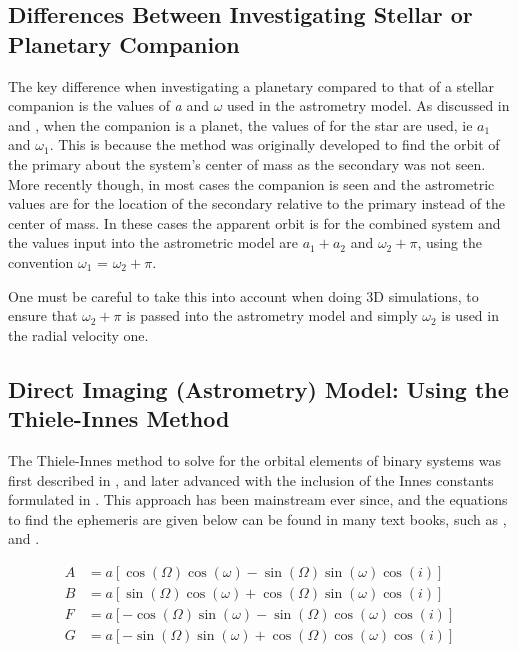 \documentclass[12pt,preprint]{aastex}
\begin{document}
\subsection{Differences Between Investigating Stellar or Planetary Companion}\label{sec:omegaIssues}

The key difference when investigating a planetary compared to that of a stellar companion is the values of {\it a} and $\omega$ used in the astrometry model.  As discussed in \citet{Shulze-Hartung} and \citet{wright2009}, when the companion is a planet, the values of for the star are used, ie $a_1$ and $\omega_1$.  This is because the method was originally developed to find the orbit of the primary about the system's center of mass as the secondary was not seen.  More recently though, in most cases the companion is seen and the astrometric values are for the location of the secondary relative to the primary instead of the center of mass.  In these cases the apparent orbit is for the combined system and the values input into the astrometric model are $a_1+a_2$ and $\omega_2+\pi$, using the convention $\omega_1$ = $\omega_2+\pi$.

One must be careful to take this into account when doing 3D simulations, to ensure that $\omega_2+\pi$ is passed into the astrometry model and simply $\omega_2$ is used in the radial velocity one.

\pagebreak


\subsection{Direct Imaging (Astrometry) Model: Using the Thiele-Innes Method}\label{sec:TH_I} 

The Thiele-Innes method to solve for the orbital elements of binary systems was first described in \citet{Thiele}, and later advanced with the inclusion of the Innes constants formulated in \citet{Van}.  This approach has been mainstream ever since, and the equations to find the ephemeris are given below can be found in many text books, such as \citet{aitken}, \citet{binnendijk} and \citet{heintz}.

\begin{subequations}
\begin{align}\label{eq:24a}
A& = a[\cos(\Omega)\cos(\omega)-\sin(\Omega)\sin(\omega)\cos(i)]\\
\label{eq:24b}
B& = a[\sin(\Omega)\cos(\omega)+\cos(\Omega)\sin(\omega)\cos(i)]\\
\label{eq:24c}
F& = a[-\cos(\Omega)\sin(\omega)-\sin(\Omega)\cos(\omega)\cos(i)]\\
\label{eq:24d}
G& = a[-\sin(\Omega)\sin(\omega)+\cos(\Omega)\cos(\omega)\cos(i)]
\end{align}
\end{subequations}
\end{document}
